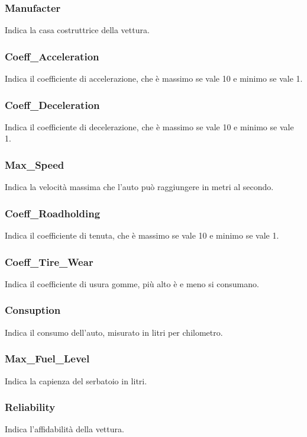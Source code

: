 \documentclass[a4paper,11pt, twoside]{book}
\begin{document}
	\subsubsection{Manufacter}
	  Indica la casa costruttrice della vettura.

	\subsubsection{Coeff\_Acceleration}
	  Indica il coefficiente di accelerazione, che è massimo se vale 10 e minimo se vale 1.

	\subsubsection{Coeff\_Deceleration}
	Indica il coefficiente di decelerazione, che è massimo se vale 10 e minimo se vale 1.

	\subsubsection{Max\_Speed}
	  Indica la velocità massima che l'auto può raggiungere in metri al secondo.

	\subsubsection{Coeff\_Roadholding}
	  Indica il coefficiente di tenuta, che è massimo se vale 10 e minimo se vale 1.

	\subsubsection{Coeff\_Tire\_Wear}
	  Indica il coefficiente di usura gomme, più alto è e meno si consumano.

	\subsubsection{Consuption} 
	  Indica il consumo dell'auto, misurato in litri per chilometro.

	\subsubsection{Max\_Fuel\_Level}
	  Indica la capienza del serbatoio in litri.
	  
	\subsubsection{Reliability}
	  Indica l'affidabilità della vettura.
      
\end{document}
